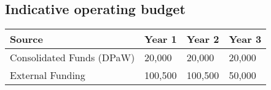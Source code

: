 \documentclass[version=last,
    paper=a4,                               %
    10pt,                                   %
    dvipsnames,
    oneside,                              %
    headings=openany,                       %
    open=any,
    BCOR=7mm,                               %
    DIV=15,     %
]{scrbook}
\begin{document}
\subsection*{Indicative operating budget }



\begin{longtabu} to \linewidth { |  X | X | X | X | }
\hline
{}
Source & Year 1 & Year 2 & Year 3\\
\hline
\endhead



Consolidated Funds (DPaW) & 20,000 & 20,000 & 20,000\\



External Funding & 100,500 & 100,500 & 50,000\\


\hline
\end{longtabu}






\end{document}
